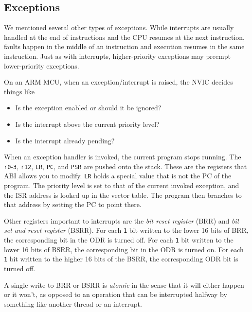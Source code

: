 
\subsection{Exceptions}
We mentioned several other types of exceptions. While interrupts are
usually handled at the end of instructions and the CPU resumes at the
next instruction, faults happen in the middle of an instruction and
execution resumes in the same instruction. Just as with interrupts,
higher-priority exceptions may preempt lower-priority exceptions.

On an ARM MCU, when an exception/interrupt is raised,
the NVIC decides things like
\begin{itemize}
    \item Is the exception enabled or should it be ignored?
    \item Is the interrupt above the current priority level?
    \item Is the interrupt already pending?
\end{itemize}
When an exception handler is invoked, the
current program stops running. The \texttt{r0}-\texttt{3},
\texttt{r12}, \texttt{LR}, \texttt{PC}, and \texttt{PSR}
are pushed onto the stack. These are the registers
that ABI allows you to modify. \texttt{LR} holds a
special value that is not the PC of the program.
The priority level is set to that of the current
invoked exception, and the ISR address is looked
up in the vector table. The program then branches
to that address by setting the PC to point there.

Other registers important to interrupts are the
\emph{bit reset register} (BRR) and
\emph{bit set and reset register} (BSRR).
For each \texttt{1} bit written to the lower 16
bits of BRR, the corresponding bit in the ODR
is turned off. For each \texttt{1} bit written
to the lower 16 bits of BSRR, the corresponding
bit in the ODR is turned on. For each \texttt{1}
bit written to the higher 16 bits of the BSRR,
the corresponding ODR bit is turned off.

A single write to BRR or BSRR is \emph{atomic}
in the sense that it will either happen or it
won't, as opposed to an operation that can be
interrupted halfway by something like another
thread or an interrupt.
